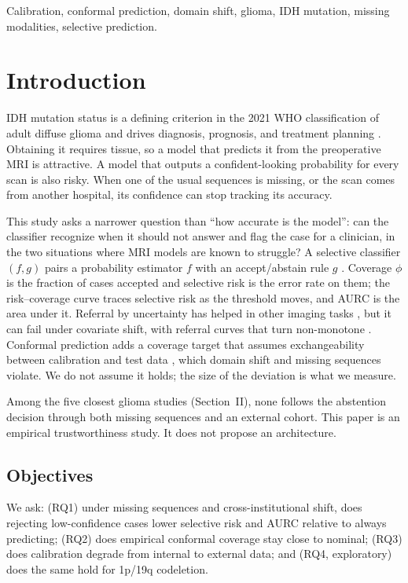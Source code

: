 \documentclass[conference]{IEEEtran}
\begin{document}
\begin{IEEEkeywords}
Calibration, conformal prediction, domain shift, glioma, IDH mutation, missing modalities, selective prediction.
\end{IEEEkeywords}

\section{Introduction}

IDH mutation status is a defining criterion in the 2021 WHO classification of adult diffuse glioma and drives diagnosis, prognosis, and treatment planning \cite{louis2021}. Obtaining it requires tissue, so a model that predicts it from the preoperative MRI is attractive. A model that outputs a confident-looking probability for every scan is also risky. When one of the usual sequences is missing, or the scan comes from another hospital, its confidence can stop tracking its accuracy.

This study asks a narrower question than ``how accurate is the model'': can the classifier recognize when it should not answer and flag the case for a clinician, in the two situations where MRI models are known to struggle? A selective classifier $(f,g)$ pairs a probability estimator $f$ with an accept/abstain rule $g$ \cite{chow1970,geifman2017}. Coverage $\phi$ is the fraction of cases accepted and selective risk is the error rate on them; the risk--coverage curve traces selective risk as the threshold moves, and AURC is the area under it. Referral by uncertainty has helped in other imaging tasks \cite{leibig2017}, but it can fail under covariate shift, with referral curves that turn non-monotone \cite{srivastava2023}. Conformal prediction adds a coverage target that assumes exchangeability between calibration and test data \cite{vovk2005,angelopoulos2023}, which domain shift and missing sequences violate. We do not assume it holds; the size of the deviation is what we measure.

Among the five closest glioma studies (Section~II), none follows the abstention decision through both missing sequences and an external cohort. This paper is an empirical trustworthiness study. It does not propose an architecture.

\subsection{Objectives}
We ask: (RQ1) under missing sequences and cross-institutional shift, does rejecting low-confidence cases lower selective risk and AURC relative to always predicting; (RQ2) does empirical conformal coverage stay close to nominal; (RQ3) does calibration degrade from internal to external data; and (RQ4, exploratory) does the same hold for 1p/19q codeletion.
\end{document}
